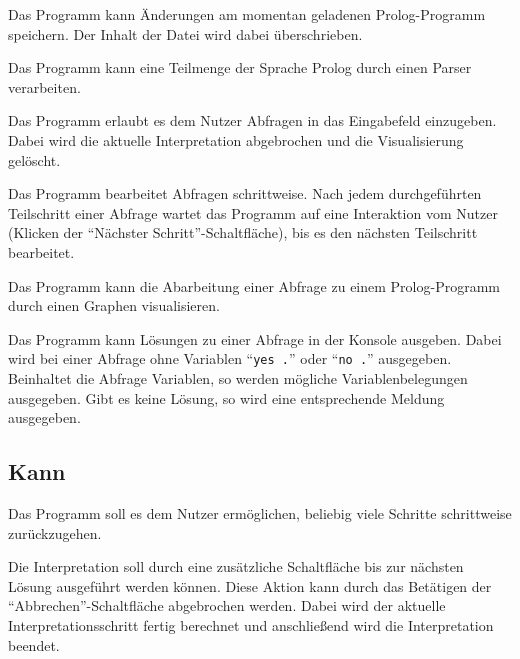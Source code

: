 \documentclass[parskip=full,11pt,twoside]{scrartcl}
\begin{document}
Das Programm kann Änderungen am momentan geladenen Prolog-Programm speichern. Der Inhalt der Datei wird dabei überschrieben.


Das Programm kann eine Teilmenge der Sprache Prolog durch einen Parser verarbeiten.


Das Programm erlaubt es dem Nutzer Abfragen in das Eingabefeld einzugeben. Dabei wird die aktuelle Interpretation abgebrochen und die Visualisierung gelöscht.


Das Programm bearbeitet Abfragen schrittweise. Nach jedem durchgeführten Teilschritt einer Abfrage wartet das Programm auf eine Interaktion vom Nutzer (Klicken der \enquote{Nächster Schritt}-Schaltfläche), bis es den nächsten Teilschritt bearbeitet.


Das Programm kann die Abarbeitung einer Abfrage zu einem Prolog-Programm durch einen Graphen visualisieren.


Das Programm kann Lösungen zu einer Abfrage in der Konsole ausgeben. Dabei wird bei einer Abfrage ohne Variablen \enquote{\texttt{yes .}} oder \enquote{\texttt{no .}} ausgegeben. Beinhaltet die Abfrage Variablen, so werden mögliche Variablenbelegungen ausgegeben. Gibt es keine Lösung, so wird eine entsprechende Meldung ausgegeben.

\subsection{Kann}


Das Programm soll es dem Nutzer ermöglichen, beliebig viele Schritte schrittweise zurückzugehen.


Die Interpretation soll durch eine zusätzliche Schaltfläche bis zur nächsten Lösung ausgeführt werden können. Diese Aktion kann durch das Betätigen der \enquote{Abbrechen}-Schaltfläche abgebrochen werden. Dabei wird der aktuelle Interpretationsschritt fertig berechnet und anschließend wird die Interpretation beendet.
\end{document}
